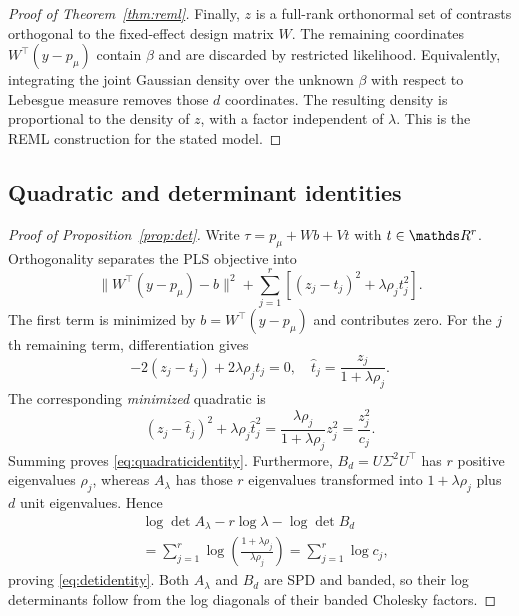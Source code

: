 \begin{proof}[Proof of Theorem~\ref{thm:reml}]
Finally, $z$ is a full-rank orthonormal set
of contrasts orthogonal to the fixed-effect
design matrix $W$. The remaining coordinates
$W^\top(y-p_\mu)$ contain $\beta$ and are
discarded by restricted likelihood. Equivalently,
integrating the joint Gaussian density over
the unknown $\beta$ with respect to Lebesgue
measure removes those $d$ coordinates.
The resulting density is proportional to the
density of $z$, with a factor independent
of $\lambda$. This is the REML construction
for the stated model.
\end{proof}

\subsection{Quadratic and determinant identities}

\begin{proof}[Proof of Proposition~\ref{prop:det}]
Write $\tau=p_\mu+Wb+Vt$ with
$t\in\R^r$. Orthogonality separates
the PLS objective into
\begin{equation}\label{eq:orthogonal-objective}
\|W^\top(y-p_\mu)-b\|^2+
\sum_{j=1}^r\left[
(z_j-t_j)^2+\lambda\rho_jt_j^2\right].
\end{equation}
The first term is minimized by
$b=W^\top(y-p_\mu)$ and contributes
zero. For the $j$th remaining term,
differentiation gives
\begin{equation}\label{eq:orthogonal-first-order-condition}
-2(z_j-t_j)+2\lambda\rho_jt_j=0,
\quad
\widehat t_j=\frac{z_j}{1+\lambda\rho_j}.
\end{equation}
The corresponding \emph{minimized}
quadratic is
\begin{equation}\label{eq:orthogonal-minimum}
(z_j-\widehat t_j)^2+
\lambda\rho_j\widehat t_j^2
=\frac{\lambda\rho_j}{1+\lambda\rho_j}
z_j^2=\frac{z_j^2}{c_j}.
\end{equation}
Summing proves \eqref{eq:quadraticidentity}.
Furthermore, $B_d=U\Sigma^2U^\top$
has $r$ positive eigenvalues $\rho_j$,
whereas $A_\lambda$ has those
$r$ eigenvalues transformed into
$1+\lambda\rho_j$ plus $d$ unit
eigenvalues. Hence
\begin{equation}\label{eq:logdet-spectral-proof}
\begin{aligned}
&\log\det A_\lambda-r\log\lambda-\log\det B_d\\
&=\sum_{j=1}^r\log\!\left(
\frac{1+\lambda\rho_j}{\lambda\rho_j}
\right)
=\sum_{j=1}^r\log c_j,
\end{aligned}
\end{equation}
proving \eqref{eq:detidentity}.
Both $A_\lambda$ and $B_d$ are SPD
and banded, so their log determinants
follow from the log diagonals of
their banded Cholesky factors.
\end{proof}
